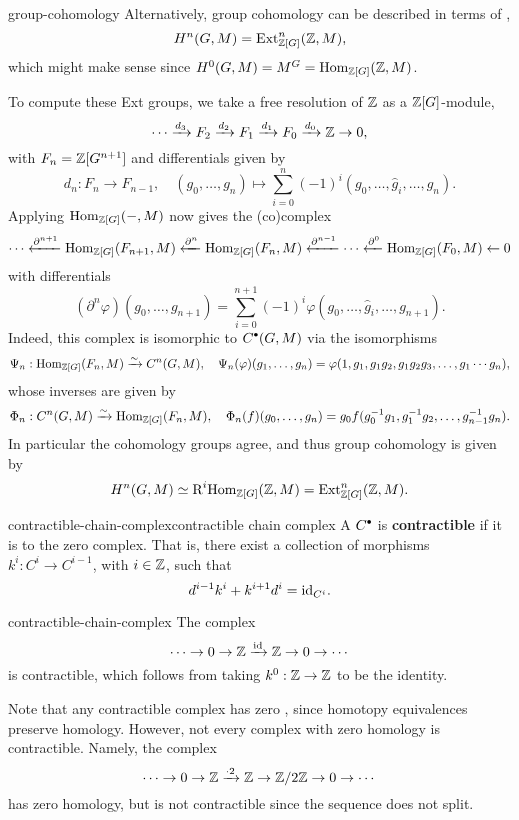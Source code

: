\begin{example}{group-cohomology}
    Alternatively, group cohomology can be described in terms of ,
    \[ H^n(G, M) = \textup{Ext}^n_{\mathbb{Z}[G]}(\mathbb{Z}, M) , \]
    which might make sense since $H^0(G, M) = M^G = \text{Hom}_{\mathbb{Z}[G]}(\mathbb{Z}, M)$.
    
    To compute these Ext groups, we take a free resolution of $\mathbb{Z}$ as a $\mathbb{Z}[G]$-module,
    \[ \cdots \xrightarrow{d_3} F_2 \xrightarrow{d_2} F_1 \xrightarrow{d_1} F_0 \xrightarrow{d_0} \mathbb{Z} \to 0 , \]
    with $F_n = \mathbb{Z}[G^{n + 1}]$ and differentials given by
    \[ d_n : F_n \to F_{n - 1}, \quad (g_0, \ldots, g_n) \mapsto \sum_{i = 0}^{n} (-1)^i (g_0, \ldots, \widehat{g}_i, \ldots, g_n) . \]
    Applying $\text{Hom}_{\mathbb{Z}[G]}(-, M)$ now gives the (co)complex
    \[ \cdots \xleftarrow{\partial^{n + 1}} \text{Hom}_{\mathbb{Z}[G]}(F_{n + 1}, M) \xleftarrow{\partial^n} \text{Hom}_{\mathbb{Z}[G]}(F_n, M) \xleftarrow{\partial^{n - 1}} \cdots \xleftarrow{\partial^0} \text{Hom}_{\mathbb{Z}[G]}(F_0, M) \leftarrow 0 \]
    with differentials
    \[ (\partial^n \varphi)(g_0, \ldots, g_{n + 1}) = \sum_{i = 0}^{n + 1} (-1)^i \varphi(g_0, \ldots, \widehat{g}_i, \ldots, g_{n + 1}) . \]
    Indeed, this complex is isomorphic to $C^\bdot(G, M)$ via the isomorphisms
    \[ \Psi_n : \text{Hom}_{\mathbb{Z}[G]}(F_n, M) \xrightarrow{\sim} C^n(G, M), \quad \Psi_n(\varphi)(g_1, \ldots, g_n) = \varphi(1, g_1, g_1 g_2, g_1 g_2 g_3, \ldots, g_1 \cdots g_n ) , \]
    whose inverses are given by
    \[ \Phi_n : C^n(G, M) \xrightarrow{\sim} \text{Hom}_{\mathbb{Z}[G]}(F_n, M), \quad \Phi_n(f)(g_0, \ldots, g_n) = g_0 f(g_0^{-1} g_1, g_1^{-1} g_2, \ldots, g_{n - 1}^{-1} g_n) . \]
    In particular the cohomology groups agree, and thus group cohomology is given by
    \[ H^n(G, M) \simeq \textup{R}^i \text{Hom}_{\mathbb{Z}[G]}(\mathbb{Z}, M) = \textup{Ext}^n_{\mathbb{Z}[G]}(\mathbb{Z}, M) . \]
\end{example}

\begin{topic}{contractible-chain-complex}{contractible chain complex}
    A  $C^\bdot$ is \textbf{contractible} if it is  to the zero complex. That is, there exist a collection of morphisms $k^i : C^i \to C^{i - 1}$, with $i \in \mathbb{Z}$, such that
    \[ d^{i - 1} k^i + k^{i + 1} d^i = \text{id}_{C^i} . \]
\end{topic}

\begin{example}{contractible-chain-complex}
    The complex
    \[ \cdots \to 0 \to \mathbb{Z} \xrightarrow{\text{id}} \mathbb{Z} \to 0 \to \cdots \]
    is contractible, which follows from taking $k^0 : \mathbb{Z} \to \mathbb{Z}$ to be the identity.
    
    Note that any contractible complex has zero , since homotopy equivalences preserve homology. However, not every complex with zero homology is contractible. Namely, the complex
    \[ \cdots \to 0 \to \mathbb{Z} \xrightarrow{\cdot 2} \mathbb{Z} \to \mathbb{Z} / 2\mathbb{Z} \to 0 \to \cdots \]
    has zero homology, but is not contractible since the sequence does not split.
\end{example}

